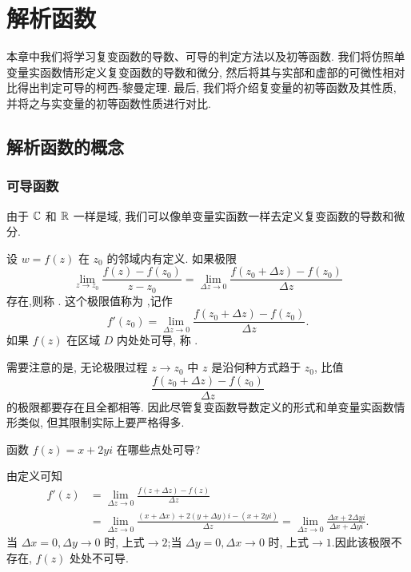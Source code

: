 \chapter{解析函数}
\label{chapter:2}

本章中我们将学习复变函数的导数、可导的判定方法以及初等函数.
我们将仿照单变量实函数情形定义复变函数的导数和微分, 然后将其与实部和虚部的可微性相对比得出判定可导的柯西-黎曼定理.
最后, 我们将介绍复变量的初等函数及其性质, 并将之与实变量的初等函数性质进行对比.

\section{解析函数的概念}

\subsection{可导函数}

由于 ${\mathbb{C}}$ 和 ${\mathbb{R}}$ 一样是域, 我们可以像单变量实函数一样去定义复变函数的导数和微分.

\begin{definition}
  设 $w=f(z)$ 在 $z_0$ 的邻域内有定义.
  如果极限
  \[
     \lim_{z\to z_0}\frac{f(z)-f(z_0)}{z-z_0}
    =\lim_{\Delta z\to 0}\frac{f(z_0+\Delta z)-f(z_0)}{\Delta z}
  \]
  存在,则称 .
  这个极限值称为 ,记作
  \[
    f'(z_0)=\lim_{\Delta z\to 0}\frac{f(z_0+\Delta z)-f(z_0)}{\Delta z}.
  \]
  如果 $f(z)$ 在区域 $D$ 内处处可导, 称 .
\end{definition}

需要注意的是, 无论极限过程 $z\to z_0$ 中 $z$ 是沿何种方式趋于 $z_0$, 比值
\[
  \frac{f(z_0+\Delta z)-f(z_0)}{\Delta z}
\]
的极限都要存在且全都相等.
因此尽管复变函数导数定义的形式和单变量实函数情形类似, 但其限制实际上要严格得多.

\begin{example}
  函数 $f(z)=x+2yi$ 在哪些点处可导?
\end{example}

\begin{solution}
  由定义可知
  \begin{align*}
    f'(z)&=\lim_{\Delta z\to 0}\frac{f(z+\Delta z)-f(z)}{\Delta z}\\
    &=\lim_{\Delta z\to 0}\frac{(x+\Delta x)+2(y+\Delta y)i-(x+2yi)}{\Delta z}
    =\lim_{\Delta z\to 0}\frac{\Delta x+2\Delta y i}{\Delta x+\Delta yi}.
  \end{align*}
  当 $\Delta x=0, \Delta y\to 0$ 时, 上式$\to2$;当 $\Delta y=0, \Delta x\to 0$ 时, 上式$\to1$.因此该极限不存在, $f(z)$ 处处不可导.
\end{solution}

